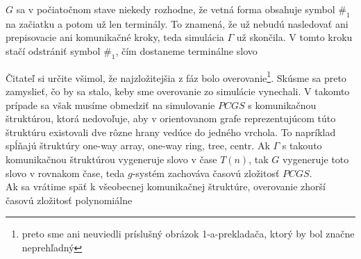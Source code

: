 \begin{dokaz}
\begin{description}
    $G$ sa v počiatočnom stave niekedy rozhodne, že vetná forma
    obsahuje symbol $\#_1$ na začiatku a potom už len terminály. To znamená,
    že už nebudú nasledovať ani prepisovacie ani komunikačné kroky, teda simulácia
    $\Gamma$ už skončila. V tomto kroku stačí odstrániť symbol
    $\#_1$, čím dostaneme terminálne slovo
  \end{description}
  Čitateľ si určite všimol, že najzložitejšia z fáz bolo
  overovanie\footnote{preto sme ani neuviedli príslušný obrázok
  1-a-prekladača, ktorý by bol značne neprehľadný}. Skúsme sa preto
  zamyslieť, čo by sa stalo, keby sme overovanie zo simulácie
  vynechali. V takomto prípade sa však musíme obmedziť na
  simulovanie $PCGS$ s komunikačnou štruktúrou, ktorá nedovoľuje,
  aby v orientovanom grafe reprezentujúcom túto štruktúru existovali
  dve rôzne hrany vedúce do jedného vrchola. To napríklad spĺňajú
  štruktúry one-way array, one-way ring, tree, centr. Ak $\Gamma$ s
  takouto komunikačnou štruktúrou vygeneruje slovo v čase $T(n)$,
  tak $G$ vygeneruje toto slovo v rovnakom čase, teda $g$-systém
  zachováva časovú zložitosť $PCGS$.
  \\ Ak sa vrátime späť k všeobecnej komunikačnej štruktúre,
  overovanie zhorší časovú zložitosť polynomiálne
\end{dokaz}
